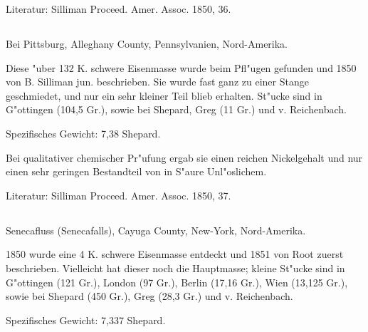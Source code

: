 \documentclass[a4paper, 11pt, oneside]{article}
\begin{document}
\normalsize
Literatur: Silliman Proceed. Amer. Assoc. 1850, 36.

\subsection{}
\LARGE
\paragraph{}
Bei Pittsburg, Alleghany County, Pennsylvanien, Nord-Amerika.

Diese "uber 132 K. schwere Eisenmasse wurde beim Pfl"ugen gefunden und 1850 von B. Silliman jun. beschrieben. Sie wurde fast ganz zu einer Stange geschmiedet, und nur ein sehr kleiner Teil blieb erhalten. St"ucke sind in G"ottingen (104,5 Gr.), sowie bei Shepard, Greg (11 Gr.) und v. Reichenbach.

Spezifisches Gewicht: 7,38 Shepard.

Bei qualitativer chemischer Pr"ufung ergab sie einen reichen Nickelgehalt und nur einen sehr geringen Bestandteil von in S"aure Unl"oslichem.

\normalsize
Literatur: Silliman Proceed. Amer. Assoc. 1850, 37.

\subsection{}
\LARGE
\paragraph{}
Senecafluss (Senecafalls), Cayuga County, New-York, Nord-Amerika.

1850 wurde eine 4 K. schwere Eisenmasse entdeckt und 1851 von Root zuerst beschrieben. Vielleicht hat dieser noch die Hauptmasse; kleine St"ucke sind in G"ottingen (121 Gr.), London (97 Gr.), Berlin (17,16 Gr.), Wien (13,125 Gr.), sowie bei Shepard (450 Gr.), Greg (28,3 Gr.) und v. Reichenbach.

Spezifisches Gewicht: 7,337 Shepard.
\end{document}
